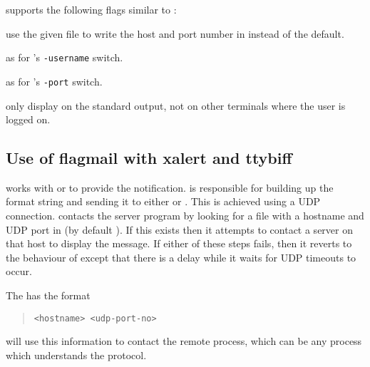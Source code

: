  supports the following flags similar to :
\begin{describe}
\item[\verb|-f hostfile|:] use the given file to write the host and port
number in instead of the default.
\item[\verb|-u username|:] as for 's \verb|-username| switch.
\item[\verb|-p port|:] as for 's \verb|-port| switch.
\item[\verb|-s|:] only display on the standard output, not on other
terminals where the user is logged on.
\end{describe}


\subsection{Use of flagmail with xalert and ttybiff}

 works with  or  to provide the
notification.  is responsible for building up the
format string and sending it to either  or .
This is achieved using a UDP connection.  contacts the
server program by looking for a file with a hostname and UDP port in
(by default ). If this exists then it
attempts to contact a server on that host to display the message. If
either of these steps fails, then it reverts to the behaviour of
 except that there is a delay while it waits for UDP
timeouts to occur.

The  has the format
\begin{quote}\small\begin{verbatim}
<hostname> <udp-port-no>
\end{verbatim}\end{quote}

 will use this information to contact the remote
process, which can be any process which understands the 
protocol.

